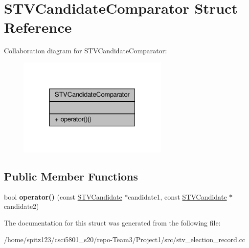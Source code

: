\hypertarget{structSTVCandidateComparator}{}\section{S\+T\+V\+Candidate\+Comparator Struct Reference}
\label{structSTVCandidateComparator}


Collaboration diagram for S\+T\+V\+Candidate\+Comparator\+:\nopagebreak
\begin{figure}[H]
\begin{center}
\leavevmode
\includegraphics[width=211pt]{structSTVCandidateComparator__coll__graph}
\end{center}
\end{figure}
\subsection*{Public Member Functions}
\begin{DoxyCompactItemize}
\item 
\mbox{\label{structSTVCandidateComparator_ae101b7fd783e113484311eb2d501f528}} 
bool {\bfseries operator()} (const \hyperlink{classSTVCandidate}{S\+T\+V\+Candidate} $\ast$candidate1, const \hyperlink{classSTVCandidate}{S\+T\+V\+Candidate} $\ast$candidate2)
\end{DoxyCompactItemize}


The documentation for this struct was generated from the following file\+:\begin{DoxyCompactItemize}
\item 
/home/spitz123/csci5801\+\_\+s20/repo-\/\+Team3/\+Project1/src/stv\+\_\+election\+\_\+record.\+cc\end{DoxyCompactItemize}
